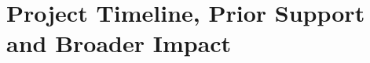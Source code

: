 \documentclass[12pt]{article}
\begin{document}
%
%
\pagestyle{empty}
%
%
\setlength{\baselineskip}{12.6pt} %
\setlength{\normalbaselineskip}{12.6pt} %

%
%






\section{Project Timeline, Prior Support and Broader Impact}

\newpage
{}
\renewcommand{\thepage} {D--\arabic{page}}


\end{document}
